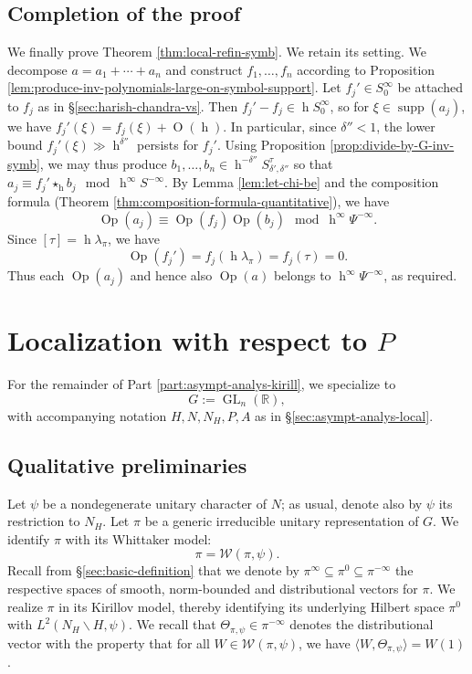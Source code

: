 \documentclass[reqno]{amsart}
\DeclareMathOperator{\GL}{GL}
\DeclareMathOperator{\h}{h}
\def\O{\operatorname{O}}
\DeclareMathOperator{\Opp}{Op}
\DeclareMathOperator{\supp}{supp}
\theoremstyle{plain} \newtheorem{theorem} {Theorem}
\theoremstyle{definition} \newtheorem{definition} [theorem] {Definition}
\theoremstyle{itplain} %
\numberwithin{equation}{section}
\numberwithin{theorem}{section}
\begin{document}
\subsection{Completion of the
  proof}\label{sec:completion-proof}
We finally prove Theorem \ref{thm:local-refin-symb}.  We retain its setting.  We decompose $a = a_1 + \dotsb + a_n$ and construct $f_1,\dotsc,f_n$ according to Proposition \ref{lem:produce-inv-polynomials-large-on-symbol-support}.  Let $f_j'\in S^\infty_0$ be attached to $f_j$ as in \S\ref{sec:harish-chandra-vs}.  Then $f_j' - f_j \in \h S^\infty_0$, so for $\xi \in \supp(a_j)$, we have $f_j'(\xi) = f_j(\xi) + \O(\h)$.  In particular, since $\delta '' < 1$, the lower bound $f_j'(\xi) \gg \h^{\delta ''}$ persists for $f_j'$.  Using Proposition \ref{prop:divide-by-G-inv-symb}, we may thus produce $b_1,\dotsc,b_n \in \h^{- \delta ''} S^\tau_{\delta ', \delta ''}$ so that $a_j \equiv f_j' \star_{\h} b_j \mod{\h^\infty S^{-\infty}}$.  By Lemma \ref{lem:let-chi-be} and the composition formula (Theorem \ref{thm:composition-formula-quantitative}), we have
\[
  \Opp(a_j) \equiv \Opp(f_j) \Opp(b_j) \mod{\h^\infty \Psi^{-\infty}}.
\]
Since $[\tau] = \h \lambda_\pi$, we have
\[
  \Opp(f_j') = f_j(\h \lambda_\pi) = f_j(\tau) = 0.
\]
Thus each $\Opp(a_j)$ and hence also $\Opp(a)$ belongs to $\h^\infty \Psi^{-\infty}$, as required.






\section{Localization with respect to $P$}
For the remainder of Part \ref{part:asympt-analys-kirill}, we specialize to
\begin{equation*}
  G := \GL_n(\mathbb{R}),
\end{equation*}
with accompanying notation $H, N, N_H, P, A$ as in \S\ref{sec:asympt-analys-local}.

\subsection{Qualitative preliminaries}\label{sec:qual-prel}

Let $\psi$ be a nondegenerate unitary character of $N$; as usual, denote also by $\psi$ its restriction to $N_H$.  Let $\pi$ be a generic irreducible unitary representation of $G$.  We identify $\pi$ with its Whittaker model:
\begin{equation*}
  \pi = \mathcal{W}(\pi,\psi).
\end{equation*}
Recall from \S\ref{sec:basic-definition} that we denote by $\pi^\infty \subseteq \pi^0 \subseteq \pi^{-\infty}$ the respective spaces of smooth, norm-bounded and distributional vectors for $\pi$.  We realize $\pi$ in its Kirillov model, thereby identifying its underlying Hilbert space $\pi^0$ with $L^2(N_H \backslash H, \psi)$.  We recall that $\Theta_{\pi,\psi} \in \pi^{-\infty}$ denotes the distributional vector with the property that for all $W \in \mathcal{W}(\pi,\psi)$, we have $\langle W, \Theta_{\pi,\psi} \rangle = W(1)$.
\end{document}
